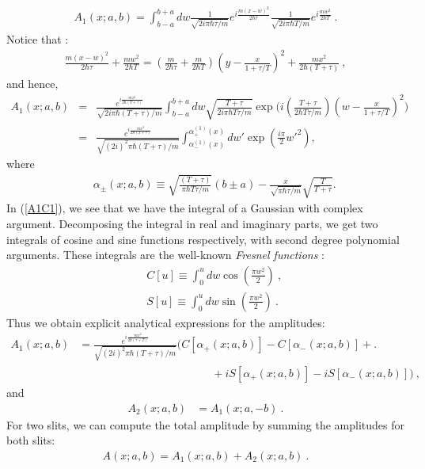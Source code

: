 \documentclass[12pt,aps,prb,preprint]{revtex4-1}   %
\begin{document}
\begin{eqnarray}\label{A11}
A_1(x;a,b)=\int_{b-a}^{b+a} dw \frac{1}{\sqrt{2i\pi
\hbar\tau/m}}e^{i\frac{m (x-w)^2}{2\hbar\tau}}
\frac{1}{\sqrt{2i\pi \hbar T/m}}e^{i\frac{m w^2}{2\hbar T}}  \ .
\end{eqnarray}
Notice that :
\begin{eqnarray*}
\frac{m(x-w)^2}{2\hbar\tau}+\frac{mw^2}{2\hbar T}=
(\frac{m}{2\hbar\tau}+\frac{m}{2\hbar
T})(y-\frac{x}{1+\tau/T})^2 + \frac{mx^2}{2\hbar(T+\tau)}\ ,
\end{eqnarray*}
and hence,
\begin{eqnarray}\label{A1C1}
A_1(x;a,b)&=&\frac{e^{i\frac{mx^2}{2\hbar
(T+\tau)}}}{\sqrt{2i\pi \hbar (T+\tau)/m}}\int_{b-a}^{b+a} dw
\sqrt{\frac{T+\tau}{2i\pi \hbar
T\tau/m}}\exp{\bigl(i(\frac{T+\tau}{2\hbar
T\tau/m})(w-\frac{x}{1+\tau/T})^2\bigr)}
{}\nonumber\\{}&=&\frac{e^{i\frac{mx^2}{2\hbar
(T+\tau)}}}{\sqrt{(2i)^2\pi \hbar
(T+\tau)/m}}\int_{\alpha_{-}^{(1)}(x)}^{\alpha_{+}^{(1)}(x)} dw'
\exp{\left(\frac{i\pi}{2} w'^2\right)},
\end{eqnarray}
where
\begin{eqnarray}\label{alpha1}
&&\alpha_{\pm}(x;a,b)\equiv\sqrt{\frac{(T+\tau)}{\pi \hbar
T\tau/m}}(b\pm a)-\frac{x}{\sqrt{\pi
\hbar\tau/m}}\sqrt{\frac{T}{T+\tau}}.
\end{eqnarray}
In (\ref{A1C1}), we see that we have the integral of a Gaussian
with complex argument. Decomposing the integral in real and
imaginary parts, we get two integrals of cosine and sine functions
respectively, with second degree polynomial arguments. These
integrals are the well-known \textit{Fresnel functions}
\cite{Abramowitz}:
\begin{eqnarray*}
&& C[u]\equiv\int_0^u dw \cos{(\frac{\pi w^2}{2})}\ , {}\\{}&&
S[u]\equiv\int_0^u dw \sin{(\frac{\pi w^2}{2})}\ .
\end{eqnarray*}
Thus we obtain explicit analytical expressions for the amplitudes:
\begin{align}\label{A1C2}
 A_1(x;a,b)&=\frac{e^{i\frac{m x^2}{2\hbar
(\tau+T)}}}{\sqrt{(2i)^2\pi \hbar (T+\tau)/m}}\bigl(C[\alpha_{+}(x;a,b)] - C[\alpha_{-}(x;a,b)] +\bigr. \nonumber\\
& \qquad\qquad\qquad\qquad\qquad\qquad + iS[\alpha_{+}(x;a,b)] - iS[\alpha_{-}(x;a,b)] \bigr)\ ,
\end{align}
and
\begin{align}\label{A2C2}
A_2(x;a,b)&=A_1(x;a,-b)\ .
\end{align}
{For two slits, we can compute the total amplitude by summing the amplitudes for both slits:
\begin{eqnarray}\label{A}
A(x;a,b)=A_1(x;a,b)+A_2(x;a,b)\ .
\end{eqnarray}}
\end{document}
